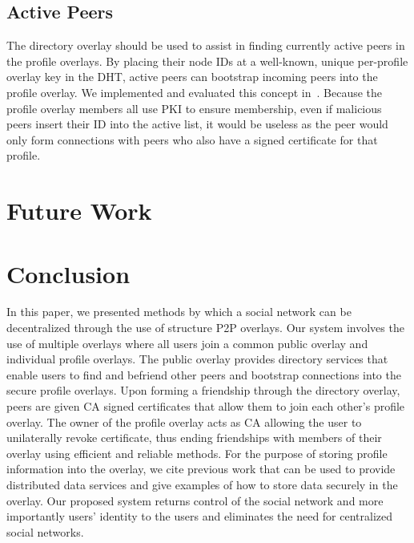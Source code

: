 \documentclass[letterpaper,twocolumn,10pt]{article}
\begin{document}
\subsection{Active Peers}
The directory overlay should be used to assist in finding currently active peers
in the profile overlays.  By placing their node IDs at a well-known, unique
per-profile overlay key in the DHT, active peers can bootstrap incoming peers
into the profile overlay.  We implemented and evaluated this concept
in~\cite{icdcs10}.  Because the profile overlay members all use PKI to ensure
membership, even if malicious peers insert their ID into the active list, it would be useless as the peer
would only form connections with peers who also have a signed certificate for
that profile.

\section{Future Work}
\label{outstanding}

\section{Conclusion}
\label{conclusion}
In this paper, we presented methods by which a social network can be
decentralized through the use of structure P2P overlays.  Our system involves
the use of multiple overlays where all users join a common public overlay and
individual profile overlays.  The public overlay provides directory services
that enable users to find and befriend other peers and bootstrap connections
into the secure profile overlays.  Upon forming a friendship through the
directory overlay, peers are given CA signed certificates that allow them to
join each other's profile overlay.  The owner of the profile overlay acts as
CA allowing the user to unilaterally revoke certificate, thus ending
friendships with members of their overlay using efficient and reliable methods.
For the purpose of storing profile information into the overlay, we cite
previous work that can be used to provide distributed data services and give
examples of how to store data securely in the overlay.  Our proposed system
returns control of the social network and more importantly users' identity to
the users and eliminates the need for centralized social networks.


\small{

\suppressfloats
}
\end{document}

